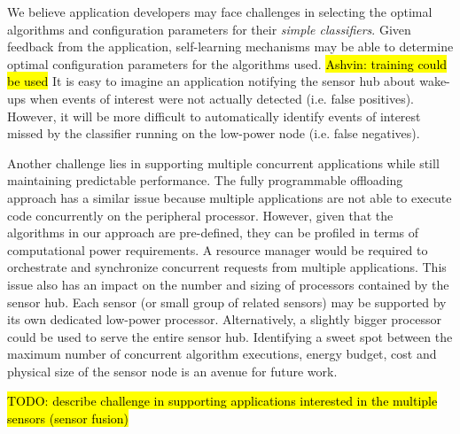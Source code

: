 We believe application developers may face challenges in selecting the optimal algorithms
and configuration parameters for their {\em simple classifiers}. Given feedback from the application, 
self-learning mechanisms may be able to determine optimal
configuration parameters for the algorithms used. \hl{Ashvin: training could be used} It is easy to imagine an application
notifying the sensor hub about wake-ups when events of interest were not actually detected (i.e. false 
positives). However, it will be more difficult to automatically identify events
of interest missed by the classifier running on the low-power node (i.e. false negatives).

Another challenge lies in supporting multiple concurrent applications while still maintaining
predictable performance. The fully programmable offloading approach has a similar issue
because multiple applications are not able to execute code concurrently on the peripheral
processor. However, given that the algorithms in our approach are pre-defined, they can be
profiled in terms of computational power requirements. A resource manager would be required to orchestrate
and synchronize concurrent requests from multiple applications. This issue also has an impact on the number and sizing of
processors contained by the sensor hub. Each sensor (or small group of related sensors) may be supported by
its own dedicated low-power processor. Alternatively, a slightly bigger processor could be used to serve
the entire sensor hub. Identifying a sweet spot between the maximum number of concurrent
algorithm executions, energy budget, cost and physical size of the sensor node is an avenue for future work.

\hl{TODO: describe challenge in supporting applications interested in the multiple sensors (sensor fusion)}